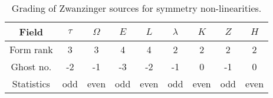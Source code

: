 \documentclass[../main.tex]{subfiles}
\begin{document}
\begin{table}[htpb]
  \caption{Grading of Zwanzinger sources for symmetry non-linearities.}%
  \label{tab:nl-sources}
  \begin{tabular}{ccccccccc}
    \toprule
    Field      & $\tau$ & $\Omega$ & $E$ & $L$  & $\lambda$ & $K$  & $Z$ & $H$  \\
    \midrule
    Form rank  & 3      & 3        & 4   & 4    & 2         & 2    & 2   & 2    \\
    Ghost no.  & -2     & -1       & -3  & -2   & -1        & 0    & -1  & 0    \\
    Statistics & odd    & even     & odd & even & odd       & even & odd & even \\
    \bottomrule
  \end{tabular}
\end{table}
\end{document}
